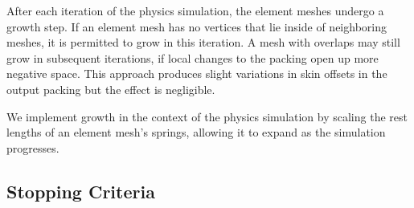 After each iteration of the physics simulation, the element meshes undergo
a growth step.  If an element mesh has no vertices that lie inside of
neighboring meshes, it is permitted to grow in this iteration.  A mesh with
overlaps may still grow in subsequent iterations, if local changes to the 
packing open up more negative space.
This approach produces slight variations in skin offsets in the output packing
but the effect is negligible.

We implement growth in the context of the physics simulation by scaling
the rest lengths of an element mesh's springs, allowing it to expand as the simulation
progresses.  




\subsection{Stopping Criteria}
\label{repulsionpak_stopping_criteria}


